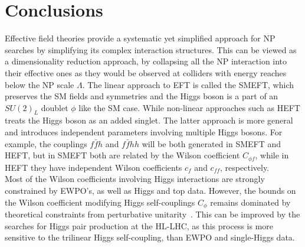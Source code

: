 \section{Conclusions \label{sec:concefts}}
Effective field theories provide a systematic yet simplified approach for NP searches by simplifying its complex interaction structures. This can be viewed as a dimensionality reduction approach, by collapsing all the NP interaction into their effective ones as they would be observed at colliders with energy reaches below the NP scale $\Lambda$. The linear approach to EFT is called the SMEFT, which preserves the SM fields and symmetries and the Higgs boson is a part of an $SU(2)_L$ doublet $\phi$ like the SM case. While non-linear approaches such as HEFT treats the Higgs boson as an added singlet. The latter approach is more general and introduces independent parameters involving multiple Higgs bosons. For example, the couplings $f\bar f h$ and $ f\bar f hh$ will be both generated in SMEFT and HEFT, but in SMEFT both are related by the Wilson coefficient $C_{\phi f}$, while in HEFT they have independent  Wilson coefficients $c_f$ and $c_{ff}$, respectively. \\  Most of the Wilson coefficients involving Higgs interactions are strongly constrained by EWPO's, as well as Higgs and top data. However, the bounds on the Wilson coefficient modifying Higgs self-couplings $C_\phi$ remains dominated by theoretical constraints from perturbative unitarity~\cite{DiLuzio:2017tfn,DiVita:2017vrr}. This can be improved by the searches for Higgs pair production at the HL-LHC, as this process is more sensitive to the trilinear Higgs self-coupling, than EWPO and single-Higgs data.
